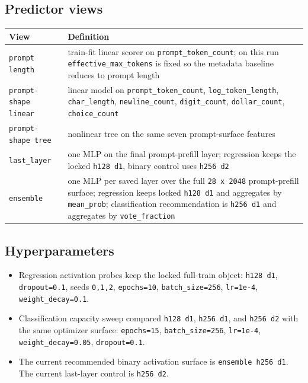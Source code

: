 \documentclass[11pt]{article}
\begin{document}
\subsection*{Predictor views}
\begin{center}
\small
\begin{tabular}{@{}p{1.5in}p{4.7in}@{}}
\toprule
View & Definition \\
\midrule
\texttt{prompt length} & train-fit linear scorer on \texttt{prompt\_token\_count}; on this run \texttt{effective\_max\_tokens} is fixed so the metadata baseline reduces to prompt length \\
\texttt{prompt-shape linear} & linear model on \texttt{prompt\_token\_count}, \texttt{log\_token\_length}, \texttt{char\_length}, \texttt{newline\_count}, \texttt{digit\_count}, \texttt{dollar\_count}, \texttt{choice\_count} \\
\texttt{prompt-shape tree} & nonlinear tree on the same seven prompt-surface features \\
\texttt{last\_layer} & one MLP on the final prompt-prefill layer; regression keeps the locked \texttt{h128 d1}, binary control uses \texttt{h256 d2} \\
\texttt{ensemble} & one MLP per saved layer over the full \texttt{28 x 2048} prompt-prefill surface; regression keeps locked \texttt{h128 d1} and aggregates by \texttt{mean\_prob}; classification recommendation is \texttt{h256 d1} and aggregates by \texttt{vote\_fraction} \\
\bottomrule
\end{tabular}
\end{center}

\subsection*{Hyperparameters}
\begin{itemize}[leftmargin=1.5em]
\item Regression activation probes keep the locked full-train object: \texttt{h128 d1}, \texttt{dropout=0.1}, seeds \texttt{0,1,2}, \texttt{epochs=10}, \texttt{batch\_size=256}, \texttt{lr=1e-4}, \texttt{weight\_decay=0.1}.
\item Classification capacity sweep compared \texttt{h128 d1}, \texttt{h256 d1}, and \texttt{h256 d2} with the same optimizer surface: \texttt{epochs=15}, \texttt{batch\_size=256}, \texttt{lr=1e-4}, \texttt{weight\_decay=0.05}, \texttt{dropout=0.1}.
\item The current recommended binary activation surface is \texttt{ensemble h256 d1}. The current last-layer control is \texttt{h256 d2}.
\end{itemize}
\end{document}
